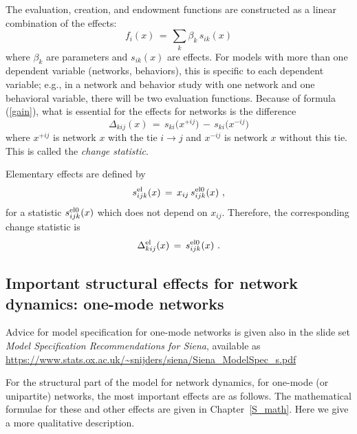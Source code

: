 \documentclass[a4paper,fleqn,11pt]{article}
\newcommand{\+}{\, + \,}
\begin{document}
The evaluation, creation, and endowment functions are constructed as a
linear combination of the effects:
\begin{equation}  \label{obj.fu}
f_i(x) \, = \, \sum_k \beta_k \, s_{ik}(x)
\end{equation}
where $\beta_k$ are parameters and $s_{ik}(x)$ are effects.
For models with more than one dependent variable (networks, behaviors),
this is specific to each dependent variable; e.g., in a network and behavior
study with one network and one behavioral variable, there will be two evaluation
functions.
Because of formula (\ref{gain}), what is essential for the effects for networks
is the difference
\begin{equation}
   \Delta_{kij} (x) \,=\,  s_{ki}\big(x^{+ij}\big) \, - \,  s_{ki}\big(x^{-ij}\big)  \label{changestat0}
\end{equation}
where $x^{+ij}$ is network $x$ with the tie $i \rightarrow j$
and $x^{-ij}$ is network $x$ without this tie.
This is called the \emph{change statistic}.

Elementary effects are defined by
\[
    s^{\rm el}_{ijk}(x) \, = \, x_{ij}\,s^{\rm el0}_{ijk}(x) \ ,
\]
for a statistic $s^{\rm el0}_{ijk}(x)$ which does not depend on $x_{ij}$. Therefore,
the corresponding change statistic is
\[
    \Delta^{\rm el}_{kij} (x) \,=\, s^{\rm el0}_{ijk}(x) \ .
\]




\subsection{Important structural effects for network dynamics:
           \protect\newline one-mode networks}
\label{S_imp_str1}

Advice for model specification for one-mode networks is given
also in the slide set
\emph{Model Specification Recommendations for Siena}, available as\\
\url{https://www.stats.ox.ac.uk/~snijders/siena/Siena_ModelSpec_s.pdf}

For the structural part of the model for network dynamics,
for one-mode (or unipartite) networks,
the most important effects are as follows.
The mathematical formulae for these and other effects are given
in Chapter~\ref{S_math}. Here we give a more qualitative description.
\end{document}

